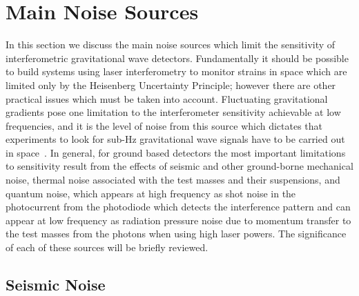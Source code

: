 \documentclass{article}
\begin{document}

\newpage

\section{Main Noise Sources}
\label{section:noise}

In this section we discuss the main noise sources which limit the sensitivity of
interferometric gravitational wave detectors. Fundamentally it should be
possible to build systems using laser interferometry to monitor strains in space
which are limited only by the Heisenberg Uncertainty Principle; however there
are other practical issues which must be taken into account. Fluctuating
gravitational gradients pose one limitation to the interferometer sensitivity
achievable at low frequencies, and it is the level of noise from this source
which dictates that experiments to look for sub-Hz gravitational wave signals
have to be carried out in space~\cite{Spero, Saulson1, Beccaria, Hughes}. In
general, for ground based detectors the most important limitations to
sensitivity result from the effects of seismic and other ground-borne mechanical
noise, thermal noise associated with the test masses and their suspensions, and
quantum noise, which appears at high frequency as shot noise in the photocurrent
from the photodiode which detects the interference pattern and can appear at low
frequency as radiation pressure noise due to momentum transfer to the test
masses from the photons when using high laser powers. The significance of each
of these sources will be briefly reviewed.


\subsection{Seismic Noise}
\label{subsection:seismic}
\end{document}
